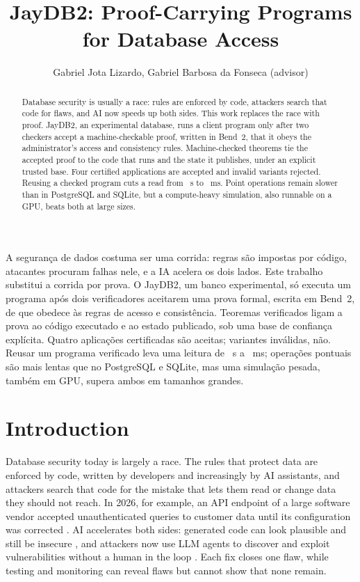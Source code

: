 \documentclass[12pt]{article}
\title{JayDB2: Proof-Carrying Programs for Database Access}
\author{Gabriel Jota Lizardo\inst{1}, Gabriel Barbosa da Fonseca\inst{1} (advisor)}
\newcommand{\num}[1]{\pgfmathprintnumber[fixed,precision=2,1000 sep={\mathord{,}}]{#1}}
\newcommand{\numbr}[1]{\pgfmathprintnumber[fixed,fixed zerofill,precision=2,use comma,1000 sep={\mathord{.}}]{#1}}
\begin{document}
\maketitle

\begin{abstract}
Database security is usually a race: rules are enforced by code, attackers
search that code for flaws, and AI now speeds up both sides. This work replaces
the race with proof. JayDB2, an experimental database, runs a client program
only after two checkers accept a machine-checkable proof, written in Bend~2,
that it obeys the administrator's access and consistency rules. Machine-checked
theorems tie the accepted proof to the code that runs and the state it
publishes, under an explicit trusted base. Four certified applications are
accepted and invalid variants rejected. Reusing a checked program cuts a read
from \num{\OrdinaryReadMedianSeconds}~s to \num{\PreparedReadVolatileMedianMs}~ms.
Point operations remain slower than in PostgreSQL and SQLite, but a
compute-heavy simulation, also runnable on a GPU, beats both at large sizes.
\end{abstract}
\begin{resumo}
A segurança de dados costuma ser uma corrida: regras são impostas por
código, atacantes procuram falhas nele, e a IA acelera os dois lados. Este
trabalho substitui a corrida por prova. O JayDB2, um banco
experimental, só executa um programa após dois verificadores aceitarem uma
prova formal, escrita em Bend~2, de que obedece às regras
de acesso e consistência. Teoremas verificados ligam a prova
ao código executado e ao estado publicado, sob uma base de confiança
explícita. Quatro aplicações certificadas são aceitas; variantes inválidas, não. Reusar um programa verificado leva uma leitura de
\numbr{\OrdinaryReadMedianSeconds}~s a \numbr{\PreparedReadVolatileMedianMs}~ms;
operações pontuais são mais lentas que no PostgreSQL e SQLite, mas uma
simulação pesada, também em GPU, supera ambos em tamanhos grandes.
\end{resumo}

\section{Introduction}
\label{sec:intro}
Database security today is largely a race. The rules that protect data are
enforced by code, written by developers and increasingly by AI assistants, and
attackers search that code for the mistake that lets them read or change data
they should not reach. In 2026, for example, an API endpoint of a large software
vendor accepted unauthenticated queries to customer data until its
configuration was corrected \cite{servicenow2026}. AI accelerates both sides:
generated code can look plausible and still be insecure \cite{pearce2022}, and
attackers now use LLM agents to discover and exploit vulnerabilities without a
human in the loop \cite{gtig2026}. Each fix closes one flaw, while testing and
monitoring can reveal flaws but cannot show that none remain.
\end{document}
